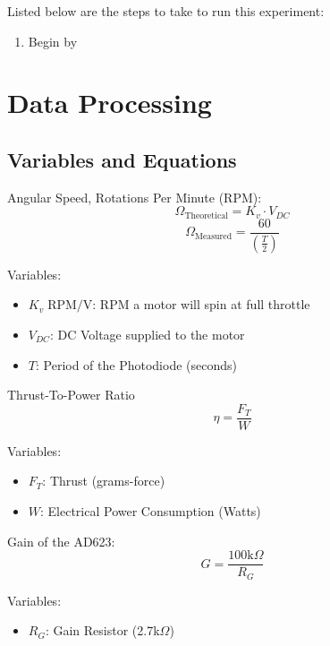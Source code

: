 \documentclass{article}
\begin{document}
Listed below are the steps to take to run this experiment:
\begin{enumerate}
  \item Begin by
\end{enumerate}

\section{Data Processing}

\subsection{Variables and Equations}  

Angular Speed, Rotations Per Minute (RPM):
\begin{equation}
    \Omega_{\text{Theoretical}} = K_{v}\cdot V_{DC}
\end{equation}
\begin{equation}
    \Omega_{\text{Measured}} = \frac{60}{\left(\frac{T}{2}\right)}
\end{equation}

Variables:
\begin{itemize}
    \item \(K_{v}\; \text{RPM/V}\):  RPM a motor will spin at full throttle
    \item \(V_{DC}\): DC Voltage supplied to the motor
    \item \(T\): Period of the Photodiode (seconds)
\end{itemize}

\vspace{5mm}
Thrust-To-Power Ratio
\begin{equation}
    \eta = \frac{F_{T}}{W}
\end{equation}

Variables:
\begin{itemize}
    \item \(F_{T}\): Thrust (grams-force)
    \item \(W\): Electrical Power Consumption (Watts)
\end{itemize}
\vspace{5mm}

Gain of the AD623:
\begin{equation}
    G = \dfrac{100\text{k}\Omega}{R_{G}}
\end{equation}

Variables:
\begin{itemize}
    \item \(R_{G}\): Gain Resistor (2.7k$\Omega$)
\end{itemize}
\end{document}
